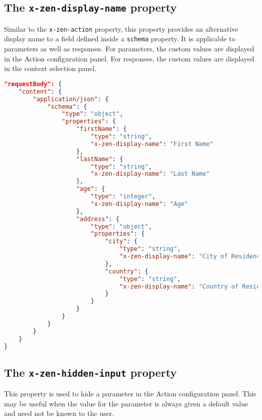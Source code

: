 \subsection{The \texttt{x-zen-display-name} property}
Similar to the \texttt{x-zen-action} property, this property provides an alternative display name to a field defined inside a \texttt{schema} property. It is applicable to parameters as well as responses. For parameters, the custom values are displayed in the Action configuration panel. For responses, the custom values are displayed in the context selection panel.
\begin{lstlisting}[caption={\texttt{x-zen-display-name} usage},label={code:x-zen-display-name},language=json]
"requestBody": {
    "content": {
        "application/json": {
            "schema": {
                "type": "object",
                "properties": {
                    "firstName": {
                        "type": "string",
                        "x-zen-display-name": "First Name"
                    },
                    "lastName": {
                        "type": "string",
                        "x-zen-display-name": "Last Name"
                    },
                    "age": {
                        "type": "integer",
                        "x-zen-display-name": "Age"
                    },
                    "address": {
                        "type": "object",
                        "properties": {
                            "city": {
                                "type": "string",
                                "x-zen-display-name": "City of Residence"
                            },
                            "country": {
                                "type": "string",
                                "x-zen-display-name": "Country of Residence"
                            }
                        }
                    }
                }
            }
        }
    }
}
\end{lstlisting}
\subsection{The \texttt{x-zen-hidden-input} property}
This property is used to hide a parameter in the Action configuration panel. This may be useful when the value for the parameter is always given a default value and need not be known to the user. 
